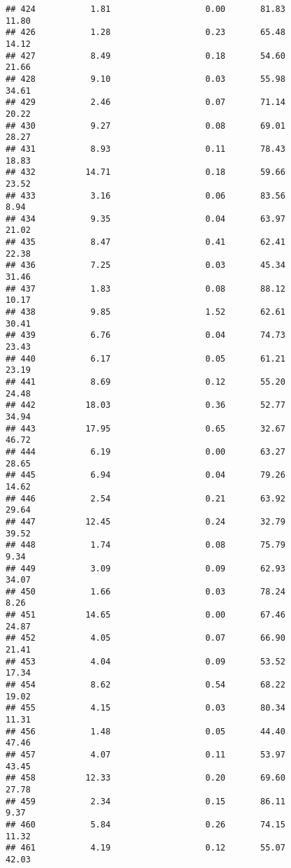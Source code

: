 \documentclass[
]{article}
\begin{document}
\begin{verbatim}
## 424           1.81                   0.00       81.83          11.80
## 426           1.28                   0.23       65.48          14.12
## 427           8.49                   0.18       54.60          21.66
## 428           9.10                   0.03       55.98          34.61
## 429           2.46                   0.07       71.14          20.22
## 430           9.27                   0.08       69.01          28.27
## 431           8.93                   0.11       78.43          18.83
## 432          14.71                   0.18       59.66          23.52
## 433           3.16                   0.06       83.56           8.94
## 434           9.35                   0.04       63.97          21.02
## 435           8.47                   0.41       62.41          22.38
## 436           7.25                   0.03       45.34          31.46
## 437           1.83                   0.08       88.12          10.17
## 438           9.85                   1.52       62.61          30.41
## 439           6.76                   0.04       74.73          23.43
## 440           6.17                   0.05       61.21          23.19
## 441           8.69                   0.12       55.20          24.48
## 442          18.03                   0.36       52.77          34.94
## 443          17.95                   0.65       32.67          46.72
## 444           6.19                   0.00       63.27          28.65
## 445           6.94                   0.04       79.26          14.62
## 446           2.54                   0.21       63.92          29.64
## 447          12.45                   0.24       32.79          39.52
## 448           1.74                   0.08       75.79           9.34
## 449           3.09                   0.09       62.93          34.07
## 450           1.66                   0.03       78.24           8.26
## 451          14.65                   0.00       67.46          24.87
## 452           4.05                   0.07       66.90          21.41
## 453           4.04                   0.09       53.52          17.34
## 454           8.62                   0.54       68.22          19.02
## 455           4.15                   0.03       80.34          11.31
## 456           1.48                   0.05       44.40          47.46
## 457           4.07                   0.11       53.97          43.45
## 458          12.33                   0.20       69.60          27.78
## 459           2.34                   0.15       86.11           9.37
## 460           5.84                   0.26       74.15          11.32
## 461           4.19                   0.12       55.07          42.03

\end{verbatim}
\end{document}

